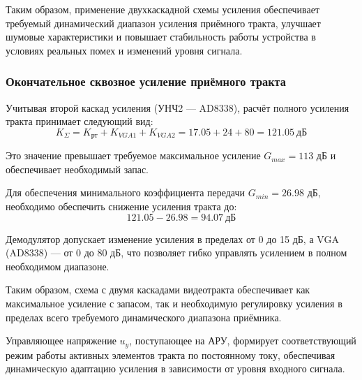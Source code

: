 \documentclass[a4paper,12pt]{article}
\begin{document}
Таким образом, применение двухкаскадной схемы усиления обеспечивает требуемый динамический диапазон усиления приёмного тракта, улучшает шумовые характеристики и повышает стабильность работы устройства в условиях реальных помех и изменений уровня сигнала.





\subsubsection{Окончательное сквозное усиление приёмного тракта}

Учитывая второй каскад усиления (УНЧ2 — AD8338), расчёт полного усиления тракта принимает следующий вид:
\begin{equation}
K_\Sigma = K_{рт} + K_{VGA1} + K_{VGA2} = 17.05 + 24 + 80 = 121.05\ \text{дБ}
\end{equation}

Это значение превышает требуемое максимальное усиление $G_{max} = 113$ дБ и обеспечивает необходимый запас. 

Для обеспечения минимального коэффициента передачи $G_{min} = 26.98$ дБ, необходимо обеспечить снижение усиления тракта до:
\begin{equation}
121.05 - 26.98 = 94.07\ \text{дБ}
\end{equation}

Демодулятор допускает изменение усиления в пределах от 0 до 15 дБ, а VGA (AD8338) — от 0 до 80 дБ, что позволяет гибко управлять усилением в полном необходимом диапазоне.

Таким образом, схема с двумя каскадами видеотракта обеспечивает как максимальное усиление с запасом, так и необходимую регулировку усиления в пределах всего требуемого динамического диапазона приёмника.

Управляющее напряжение $u_y$, поступающее на АРУ, формирует соответствующий режим работы активных элементов тракта по постоянному току, обеспечивая динамическую адаптацию усиления в зависимости от уровня входного сигнала.














\newpage
\end{document}
